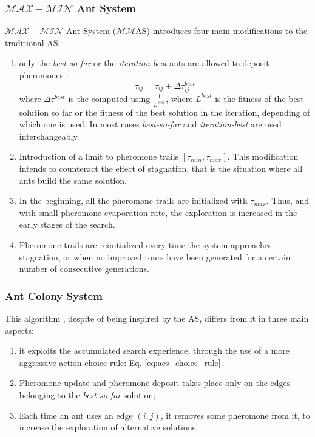 					\subsubsection*{$\mathcal{MAX}-\mathcal{MIN}$ Ant System}
					$\mathcal{MAX}-\mathcal{MIN}$ Ant System ($\mathcal{MM}$AS) introduces four main modifications to the traditional AS:
					\begin{enumerate}
						\item only the \emph{best-so-far} or the \emph{iteration-best} ants are allowed to deposit pheromones \cite{stutzle00}:
							\begin{equation}
								\label{eq:max_min_rank_pheromone_update}
								\tau_{ij} = \tau_{ij} + \Delta\tau_{ij}^{best}
							\end{equation}
							\noindent where $\Delta\tau^{best}$ is the computed using $\frac{1} {L^{best}}$, where ${L^{best}}$ is the fitness of the best solution so far or the fitness of the best solution in the iteration, depending of which one is used. In most cases \emph{best-so-far} and \emph{iteration-best} are used interchangeably.
						
						\item Introduction of a limit to pheromone trails $[\tau_{min},\tau_{max}]$. This modification intends to counteract the effect of stagnation, that is the situation where all ants build the same solution.
						
						\item In the beginning, all the pheromone trails are initialized with $\tau_{max}$. Thus, and with small pheromone evaporation rate, the exploration is increased in the early stages of the search.
						
						\item Pheromone trails are reinitialized every time the system approaches stagnation, or when no improved tours have been generated for a certain number of consecutive generations.
						 					
					\end{enumerate}
		
					\subsubsection*{Ant Colony System}
					\label{sec:acs}
					This algorithm \cite{dorigo97}, despite of being inspired by the AS, differs from it in three main aspects:
					\begin{enumerate}
						\item it exploits the accumulated search experience, through the use of a more aggressive action choice rule: Eq. \ref{eq:acs_choice_rule}. 
						\item Pheromone update and pheromone deposit takes place only on the edges belonging to the \emph{best-so-far} solution;
						\item Each time an ant uses an edge $(i,j)$, it removes some pheromone from it, to increase the exploration of alternative solutions.
					\end{enumerate}

